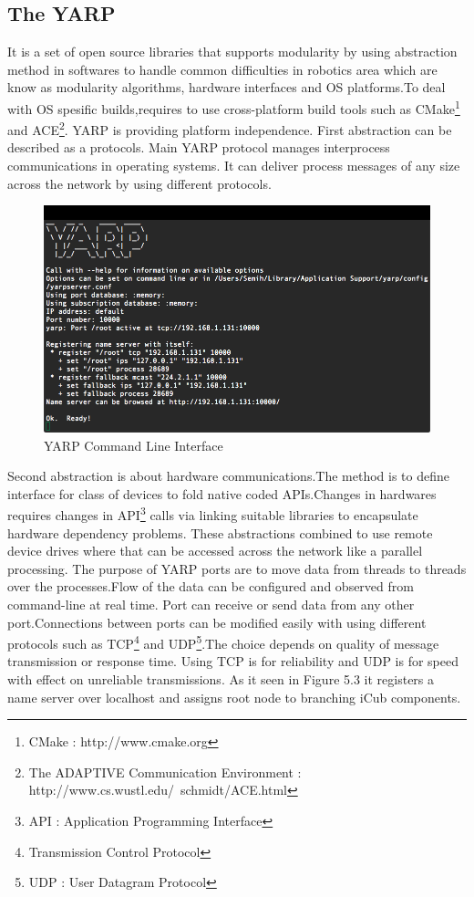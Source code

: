 \documentclass[a4paper, 11pt]{report}
\begin{document}
\subsection{The YARP}
It is a set of open source libraries that supports modularity by 
using abstraction method in softwares to handle common difficulties in 
robotics area which are know as modularity algorithms, hardware interfaces and 
OS platforms.To deal with OS spesific builds,requires to use cross-platform 
build tools such as CMake\footnote{CMake : http://www.cmake.org} and 
ACE\footnote{The ADAPTIVE Communication Environment :
  http://www.cs.wustl.edu/~schmidt/ACE.html}. YARP is providing platform 
independence. First abstraction can be described as a protocols. Main YARP 
protocol manages interprocess communications in operating systems. It can 
deliver process messages of any size across the network by using different 
protocols.
\begin{figure}[h!]
  \centering
  \includegraphics[width=1.0\linewidth]{yarp}
  \caption{YARP Command Line Interface}
  \label{fig:yarp}
\end{figure}
Second abstraction is about hardware communications.The method is to define 
interface for class of devices to fold native coded APIs.Changes in hardwares 
requires changes in API\footnote{API : Application Programming Interface} calls 
via linking suitable libraries to encapsulate 
hardware dependency problems. These abstractions combined to use remote 
device drives where that can be accessed across the network like a parallel 
processing.
The purpose of YARP ports are to move data from threads to threads over the 
processes.Flow of the data can be configured and observed from command-line 
at real time. Port can receive or send data from any other port.Connections 
between ports can be modified easily with using different protocols such as 
TCP\footnote{Transmission Control Protocol} and UDP\footnote{UDP : User 
Datagram Protocol}.The choice depends on quality of message transmission or 
response 
time. Using TCP is for reliability and UDP is for speed with effect on 
unreliable transmissions. As it seen in Figure 5.3 it registers a name server 
over localhost and assigns root node to branching iCub components.
\newpage
\end{document}
